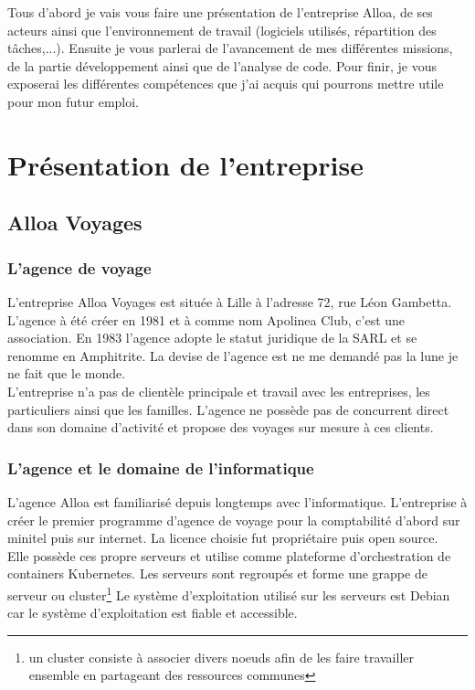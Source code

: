\documentclass[12pt,a4paper]{report}
\begin{document}
 Tous d'abord je vais vous faire une présentation de l'entreprise Alloa, de ses acteurs ainsi que  l'environnement de travail (logiciels utilisés, répartition des tâches,...). Ensuite je vous parlerai de l'avancement de mes différentes missions, de la partie développement ainsi que de l'analyse de code. Pour finir, je vous exposerai les différentes compétences que j'ai acquis qui pourrons mettre utile pour mon futur emploi.
\newpage
\chapter[Présentation]{Présentation de l'entreprise}
\section{Alloa Voyages}

\subsection{L'agence de voyage}

L'entreprise Alloa Voyages est située à Lille à l'adresse 72, rue Léon Gambetta.
L'agence à été créer en 1981 et à comme nom Apolinea Club, c'est une association. En 1983 l'agence  adopte le statut juridique de la SARL et se renomme en Amphitrite. La devise de l'agence est ne me demandé pas la lune je ne fait que le monde.\\

L'entreprise n'a pas de clientèle  principale et travail avec les entreprises, les particuliers ainsi que les familles. L'agence ne possède pas de concurrent direct dans son domaine d'activité et propose des voyages sur mesure à ces clients.
\subsection{L'agence et le domaine de l'informatique}
L'agence Alloa est familiarisé depuis longtemps avec l'informatique. L'entreprise à créer le premier programme d'agence de voyage pour la comptabilité d'abord sur minitel puis sur internet. La licence choisie fut propriétaire puis open source.\\

 Elle possède ces propre serveurs et utilise comme plateforme d'orchestration de containers Kubernetes. Les serveurs sont regroupés et forme une grappe de serveur ou cluster\footnote{un cluster consiste à associer divers noeuds afin de les faire travailler ensemble en partageant des ressources communes}
Le système d'exploitation utilisé sur les serveurs  est Debian car le système d'exploitation est fiable et accessible.\\
\end{document}
